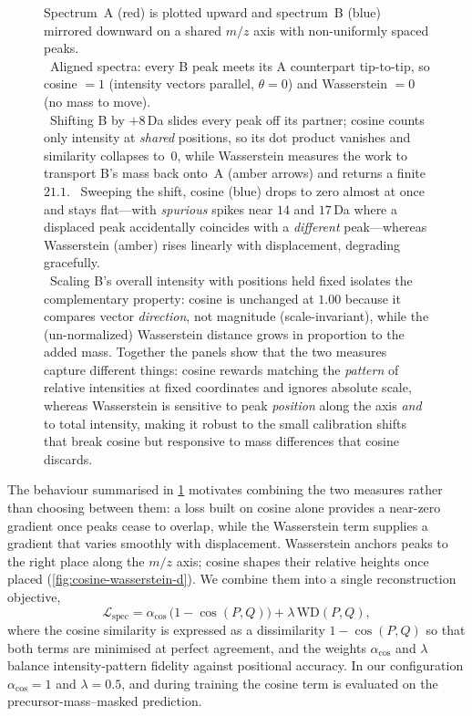 \begin{figure}[p]
    \caption[Cosine similarity versus Wasserstein distance as spectral comparison measures]{
        Spectrum~A (red) is plotted upward and spectrum~B (blue) mirrored downward on a shared $m/z$ axis with non-uniformly spaced peaks. \\
        ~Aligned spectra: every B peak meets its A counterpart tip-to-tip, so cosine $=1$ (intensity vectors parallel, $\theta = 0$) and Wasserstein $=0$ (no mass to move). \\
        ~Shifting B by $+8$\,Da slides every peak off its partner; cosine counts only intensity at \emph{shared} positions, so its dot product vanishes and similarity collapses to~$0$, while Wasserstein measures the work to transport B's mass back onto~A (amber arrows) and returns a finite $21.1$.
        ~Sweeping the shift, cosine (blue) drops to zero almost at once and stays flat---with \emph{spurious} spikes near $14$ and $17$\,Da where a displaced peak accidentally coincides with a \emph{different} peak---whereas Wasserstein (amber) rises linearly with displacement, degrading gracefully. \\
        ~Scaling B's overall intensity with positions held fixed isolates the complementary property: cosine is unchanged at $1.00$ because it compares vector \emph{direction}, not magnitude (scale-invariant), while the (un-normalized) Wasserstein distance grows in proportion to the added mass.
        Together the panels show that the two measures capture different things: cosine rewards matching the \emph{pattern} of relative intensities at fixed coordinates and ignores absolute scale, whereas Wasserstein is sensitive to peak \emph{position} along the axis \emph{and} to total intensity, making it robust to the small calibration shifts that break cosine but responsive to mass differences that cosine discards.
    }
    \label{fig:cosine-versus-wasserstein}
\end{figure}

The behaviour summarised in \cref{fig:cosine-versus-wasserstein} motivates combining the two measures rather than choosing between them: a loss built on cosine alone provides a near-zero gradient once peaks cease to overlap, while the Wasserstein term supplies a gradient that varies smoothly with displacement.
Wasserstein anchors peaks to the right place along the $m/z$ axis; cosine shapes their relative heights once placed (\cref{fig:cosine-wasserstein-d}). We combine them into a single reconstruction objective,
\begin{equation}
    \label{eq:combined-loss}
    \mathcal{L}_{\mathrm{spec}} = \alpha_{\cos}\,\bigl(1 - \cos(P,Q)\bigr) + \lambda\,\mathrm{WD}(P,Q),
\end{equation}
where the cosine similarity is expressed as a dissimilarity $1 - \cos(P,Q)$ so that both terms are minimised at perfect agreement, and the weights $\alpha_{\cos}$ and $\lambda$ balance intensity-pattern fidelity against positional accuracy. In our configuration $\alpha_{\cos}=1$ and $\lambda=0.5$, and during training the cosine term is evaluated on the precursor-mass--masked prediction.

